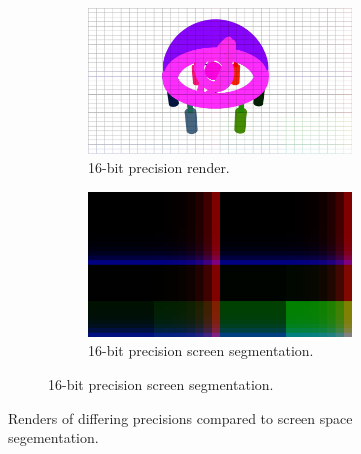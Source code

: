 \documentclass[conference]{IEEEtran}
\begin{document}
\begin{figure}[htbp]
\begin{subfigure}{1.1\textwidth}
\begin{center}
\begin{minipage}[t]{\linewidth}
\hspace{-0.09\linewidth}
  \centering
    \begin{subfigure}{.49\textwidth}
      \centering
      \includegraphics[width=\linewidth]{16_render_cropped.jpg}
      \caption{16-bit precision render.}
      \label{fig:render_8}
    \end{subfigure}
    \begin{subfigure}{.49\textwidth}
      \centering
      \includegraphics[width=\linewidth]{16_partition_cropped.jpg}
      \caption{16-bit precision screen segmentation.}
      \label{fig:render_8}
    \end{subfigure}
  \label{fig:render_16}
\end{minipage}
\end{center}
\end{subfigure}
\caption{Renders of differing precisions compared to screen space segementation.}
\label{fig:render_comparisons}
\end{figure}

\onecolumn
\end{document}
